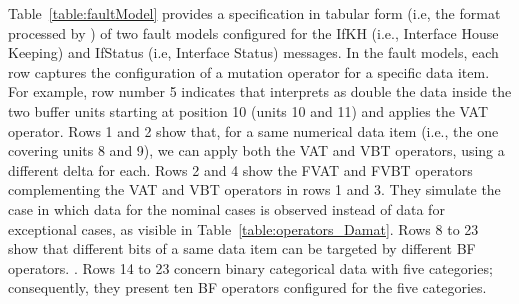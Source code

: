 %



%
%
% 
%
%
%



Table~\ref{table:faultModel} provides a specification in tabular form (i.e, the format processed by \APPR) of two fault models configured for the IfKH (i.e., Interface House Keeping) and IfStatus (i.e, Interface Status) messages. In the fault models, each row captures the configuration of a mutation operator for a specific data item. For example, row number 5 indicates that \APPR interprets as double the data inside the two buffer units starting at position 10 (units 10 and 11) and applies the VAT operator. Rows 1 and 2 show that, for a same numerical data item (i.e., the one covering units 8 and 9), we can apply both the VAT and VBT operators, using a different delta for each. 
Rows 2 and 4 show the FVAT and FVBT operators complementing the VAT and VBT operators in rows 1 and 3. They simulate the case in which data for the nominal cases is observed instead of data for exceptional cases, as visible in Table~\ref{table:operators_Damat}.
Rows 8 to 23 show that different bits of a same data item can be targeted by different BF operators. %
. 
Rows 14 to 23 concern binary categorical data with five categories; consequently, they present ten BF operators configured for the five categories.




